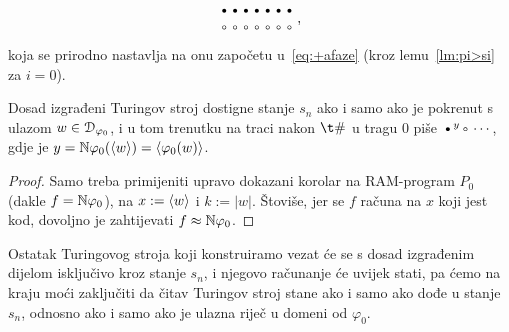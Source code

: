 \begin{primjer}
\begin{multline}
{\begin{array}{@{}c@{}}
    \text\textbullet\\
    \text\textopenbullet
    \end{array}}
    \begin{array}{@{}c@{}}
    \text\textbullet\\
    \text\textopenbullet
    \end{array}
    \begin{array}{@{}c@{}}
    \text\textbullet\\
    \text\textopenbullet
    \end{array}
    \begin{array}{@{}c@{}}
    \text\textbullet\\
    \text\textopenbullet
    \end{array}
    \begin{array}{@{}c@{}}
    \text\textbullet\\
    \text\textopenbullet
    \end{array}
    \begin{array}{@{}c@{}}
    \text\textbullet\\
    \text\textopenbullet
    \end{array}
    \begin{array}{@{}c@{}}
    \text\textbullet\\
    \text\textopenbullet
    \end{array}\,\text,
\end{multline}
koja se prirodno nastavlja na onu započetu u~\eqref{eq:+afaze} (kroz lemu~\ref{lm:pi>si} za $i=0$).
\end{primjer}

\begin{korolar}\label{kor:faza3}
Dosad izgrađeni Turingov stroj dostigne stanje $s_n$ ako i samo ako je pokrenut s ulazom $w\in\mathcal D_{\varphi_0}$, i u tom trenutku na traci nakon $\t\#$ u tragu $0$ piše $\textup\textbullet^y\textup\textopenbullet\dotsm$, gdje je $y={\mathbb N}\varphi_0(\langle w\rangle)=\langle\varphi_0(w)\rangle$.
\end{korolar}
\begin{proof}
Samo treba primijeniti upravo dokazani korolar na RAM-program $P_0$ (dakle $f={\mathbb N}\varphi_0$), na $x:=\langle w\rangle$ i $k:=\left|w\right|$. Štoviše, jer se $f$ računa na $x$ koji jest kod, dovoljno je zahtijevati $f\approx{\mathbb N}\varphi_0$.
\end{proof}

\begin{napomena}\label{nap:snstane}
Ostatak Turingovog stroja koji konstruiramo vezat će se s dosad izgrađenim dijelom isključivo kroz stanje $s_n$, i njegovo računanje će uvijek stati, pa ćemo na kraju moći zaključiti da čitav Turingov stroj stane ako i samo ako dođe u stanje $s_n$, odnosno ako i samo ako je ulazna riječ u domeni od $\varphi_0$.
\end{napomena}

